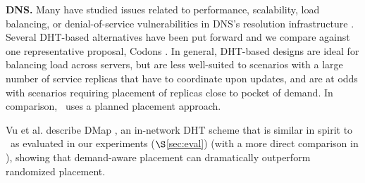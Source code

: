 
{\bf{DNS.}} Many have studied issues related to performance, scalability, load balancing, or denial-of-service vulnerabilities in DNS's resolution infrastructure \cite{Pappas,codons-paper,Brownlee,dnssec}. Several DHT-based alternatives have been put forward \cite{codons-paper,cox,DHTdns} and we compare against one representative proposal, Codons \cite{codons-paper}. In general, DHT-based designs are ideal for balancing load across servers, but are less well-suited to scenarios with a large number of service replicas that have to coordinate upon updates, and are at odds with scenarios requiring placement of replicas close to pocket of demand. In comparison, \auspice\ uses a planned placement approach.

Vu et al. describe DMap \cite{VuICDCS12}, an in-network DHT scheme 
that is similar in spirit to \staticthree\ as evaluated in our experiments ($\S$\ref{sec:eval}) (with a more direct comparison in \cite{techreport}), showing that demand-aware placement can dramatically outperform randomized placement. 



